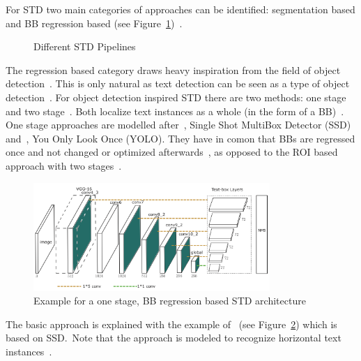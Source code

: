 For \ac{STD} two main categories of approaches can be identified: segmentation based and \ac{BB}
regression based (see
Figure~\ref{fig:STD-pipelines})~\citep{long_scene_2021,sheng_centripetaltext_2021,liu_accurate_2020}.
\begin{figure}[ht]
    \centering
    
    \caption{Different STD Pipelines\label{fig:STD-pipelines}}
\end{figure}
The regression based category draws heavy inspiration from the field of object
detection~\citep{long_scene_2021,liu_accurate_2020}.
This is only natural as text detection can be seen as a type of object
detection~\citep{liu_accurate_2020,long_scene_2021}.
For object detection inspired \ac{STD} there are two methods: one stage and two
stage~\citep{long_scene_2021}.
Both localize text instances as a whole (in the form of a
\ac{BB})~\citep{long_scene_2021,sheng_centripetaltext_2021}.
One stage approaches are modelled after~\cite{liu_ssd_2016}, Single Shot MultiBox
Detector (SSD) and~\cite{redmon_you_2016}, You Only Look Once (YOLO).
They have in comon that \acp{BB} are regressed once and not changed or optimized
afterwards~\citep{redmon_you_2016,liu_ssd_2016}, as opposed to the \ac{ROI} based approach with two
stages~\citep{girshick_rich_2014}.
\begin{figure}[ht]
    \centering
    \includegraphics[width=0.8\textwidth]{img/STD-seg-free-Liao-TextBoxes-2017.png}
    \caption[One stage, BB regression based STD architecture]{%
        Example for a one stage, BB regression based STD
        architecture~\citep{liao_textboxes_2017}\label{fig:STD-segfree-ssd}
    }
\end{figure}
The basic approach is explained with the example of~\cite{liao_textboxes_2017} (see
Figure~\ref{fig:STD-segfree-ssd}) which is based on SSD.\
Note that the approach is modeled to recognize horizontal text instances~\citep{liao_textboxes_2017}.
